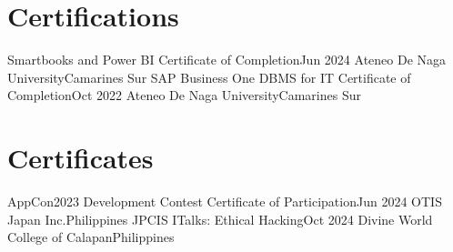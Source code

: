 \section{Certifications}
    \resumeSubHeadingListStart
        \resumeSubheading
        {Smartbooks and Power BI Certificate of Completion}{Jun 2024}
        {Ateneo De Naga University}{Camarines Sur}
        \resumeSubheading
        {SAP Business One DBMS for IT Certificate of Completion}{Oct 2022}
        {Ateneo De Naga University}{Camarines Sur}
    \resumeSubHeadingListEnd
\section{Certificates}
    \resumeSubHeadingListStart
        \resumeSubheading
        {AppCon2023 Development Contest Certificate of Participation}{Jun 2024}
        {OTIS Japan Inc.}{Philippines}
        \resumeSubheading
        {JPCIS ITalks: Ethical Hacking}{Oct 2024}
        {Divine World College of Calapan}{Philippines}
    \resumeSubHeadingListEnd